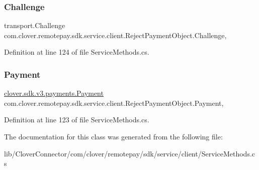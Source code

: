 \subsubsection{\texorpdfstring{Challenge}{Challenge}}
{\footnotesize\ttfamily transport.\+Challenge com.\+clover.\+remotepay.\+sdk.\+service.\+client.\+Reject\+Payment\+Object.\+Challenge\hspace{0.3cm}{\ttfamily [get]}, {\ttfamily [set]}}



Definition at line 124 of file Service\+Methods.\+cs.

\mbox{\label{classcom_1_1clover_1_1remotepay_1_1sdk_1_1service_1_1client_1_1_reject_payment_object_a8813cea081471ac9b4f034372241f219}} 
\subsubsection{\texorpdfstring{Payment}{Payment}}
{\footnotesize\ttfamily \hyperlink{classcom_1_1clover_1_1sdk_1_1v3_1_1payments_1_1_payment}{clover.\+sdk.\+v3.\+payments.\+Payment} com.\+clover.\+remotepay.\+sdk.\+service.\+client.\+Reject\+Payment\+Object.\+Payment\hspace{0.3cm}{\ttfamily [get]}, {\ttfamily [set]}}



Definition at line 123 of file Service\+Methods.\+cs.



The documentation for this class was generated from the following file\+:\begin{DoxyCompactItemize}
\item 
lib/\+Clover\+Connector/com/clover/remotepay/sdk/service/client/Service\+Methods.\+cs\end{DoxyCompactItemize}
